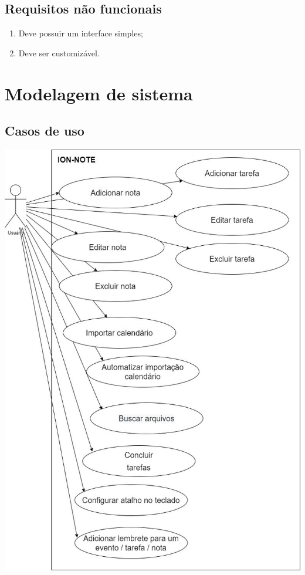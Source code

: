\documentclass[
	12pt,				%
	openright,			%
	oneside,			    %
	a4paper,				%
	english,			%
	french,			%
	spanish,			%
	brazil			%
	]{abntex2}
\begin{document}
\section{Requisitos não funcionais}
\begin{enumerate}
    \item Deve possuir um interface simples;
    \item Deve ser customizável.
\end{enumerate}

\chapter{Modelagem de sistema}
\section{Casos de uso}
\includegraphics[scale=0.4]{Imagens/Casos-de-uso.jpeg}
\end{document}
